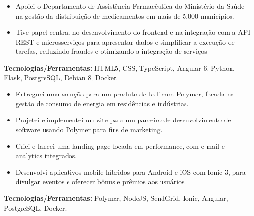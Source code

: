 \documentclass[10pt,a4paper]{altacv}
\begin{document}
\begin{itemize}
    \setlength{\itemindent}{0.5em}
    \item[--] Apoiei o Departamento de Assistência Farmacêutica do Ministério da Saúde na gestão da distribuição de medicamentos em mais de 5.000 municípios.
    \item[--] Tive papel central no desenvolvimento do frontend e na integração com a API REST e microsserviços para apresentar dados e simplificar a execução de tarefas, reduzindo fraudes e otimizando a integração de serviços.
\end{itemize}
\textbf{Tecnologias/Ferramentas:} HTML5, CSS, TypeScript, Angular 6, Python, Flask, PostgreSQL, Debian 8, Docker.
\vspace{5mm}

\begin{itemize}
    \setlength{\itemindent}{0.5em}
    \item[--] Entreguei uma solução para um produto de IoT com Polymer, focada na gestão de consumo de energia em residências e indústrias.
    \item[--] Projetei e implementei um site para um parceiro de desenvolvimento de software usando Polymer para fins de marketing.
    \item[--] Criei e lancei uma landing page focada em performance, com e-mail e analytics integrados.
    \item[--] Desenvolvi aplicativos mobile híbridos para Android e iOS com Ionic 3, para divulgar eventos e oferecer bônus e prêmios aos usuários.
\end{itemize}
\textbf{Tecnologias/Ferramentas:} Polymer, NodeJS, SendGrid, Ionic, Angular, PostgreSQL, Docker.
\vspace{5mm}
\end{document}
